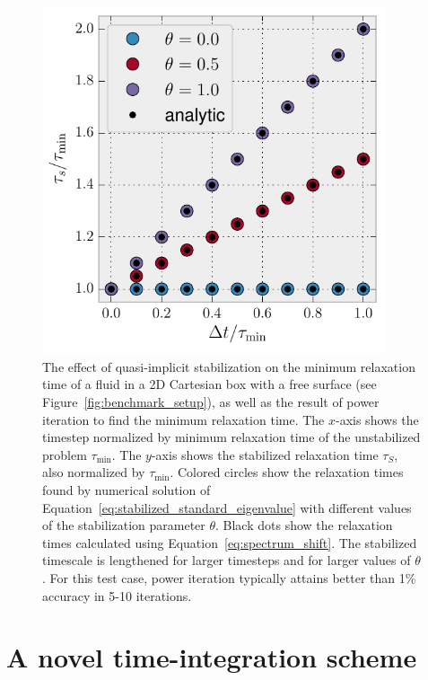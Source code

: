 \documentclass[preprint,12pt,authoryear]{elsarticle}
\begin{document}
\begin{figure}
\includegraphics[width=0.9\textwidth]{figures/perturb_spectrum.pdf}
\caption[The effect of quasi-implicit stabilization on the minimum relaxation time of a fluid in a 2D Cartesian box with a free surface (see Figure~\ref{fig:benchmark_setup}), as well as the result of power iteration to find the minimum relaxation time.]{The effect of quasi-implicit stabilization on the minimum relaxation time of a fluid in a 2D Cartesian box with a free surface (see Figure~\ref{fig:benchmark_setup}), as well as the result of power iteration to find the minimum relaxation time. The $x$-axis shows the timestep normalized by minimum relaxation time of the unstabilized problem $\tau_\mathrm{\min}$. The $y$-axis shows the stabilized relaxation time $\tau_S$, also normalized by $\tau_\mathrm{min}$. Colored circles show the relaxation times found by numerical solution of Equation~\eqref{eq:stabilized_standard_eigenvalue} with different values of the stabilization parameter $\theta$. Black dots show the relaxation times calculated using Equation~\eqref{eq:spectrum_shift}. The stabilized timescale is lengthened for larger timesteps and for larger values of $\theta$. For this test case, power iteration typically attains better than 1\% accuracy in 5-10 iterations.}
\label{fig:perturb_spectrum}
\end{figure}


\section{A novel time-integration scheme}
\label{sec:newscheme}
\end{document}
